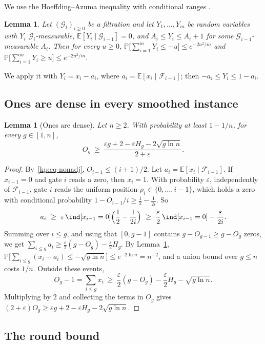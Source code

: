 \documentclass[11pt]{amsart}
\newtheorem{lemma}[theorem]{Lemma}
\theoremstyle{definition}
\theoremstyle{remark}
\newcommand{\eps}{\varepsilon}
\newcommand{\PP}{\mathbb{P}}
\newcommand{\EE}{\mathbb{E}}
\newcommand{\cF}{\mathcal{F}}
\begin{document}
We use the Hoeffding--Azuma inequality with conditional ranges
\cite{hoeffding,kp-mcdiarmid}.

\begin{lemma}\label{kp:azuma}
Let $(\mathcal G_i)_{i\ge 0}$ be a filtration and let $Y_1,\dots,Y_m$ be random
variables with $Y_i$ $\mathcal G_i$-measurable, $\EE[Y_i\mid\mathcal G_{i-1}]=0$,
and $A_i\le Y_i\le A_i+1$ for some $\mathcal G_{i-1}$-measurable $A_i$. Then for
every $u\ge 0$,
$\PP\bigl[\sum_{i=1}^m Y_i\le -u\bigr]\le e^{-2u^2/m}$ and
$\PP\bigl[\sum_{i=1}^m Y_i\ge u\bigr]\le e^{-2u^2/m}$.
\end{lemma}

We apply it with $Y_i=x_i-a_i$, where $a_i=\EE[x_i\mid\cF_{i-1}]$; then
$-a_i\le Y_i\le 1-a_i$.

\subsection{Ones are dense in every smoothed instance}\label{kp:sub-dense}

\begin{lemma}[Ones are dense]\label{kp:dense}
Let $n\ge 2$. With probability at least $1-1/n$, for every $g\in[1,n]$,
\[
  O_g\ \ge\ \frac{\eps g+2-\eps H_g-2\sqrt{g\ln n}}{2+\eps}.
\]
\end{lemma}

\begin{proof}
By~\eqref{kp:eq-nonadj}, $O_{i-1}\le(i+1)/2$. Let $a_i=\EE[x_i\mid\cF_{i-1}]$.
If $x_{i-1}=0$ and gate $i$ reads a zero, then $x_i=1$. With probability $\eps$,
independently of $\cF_{i-1}$, gate $i$ reads the uniform position
$\rho_i\in\{0,\dots,i-1\}$, which holds a zero with conditional probability
$1-O_{i-1}/i\ge\frac12-\frac1{2i}$. So
\[
  a_i\ \ge\ \eps\,\ind[x_{i-1}=0]\Bigl(\frac12-\frac1{2i}\Bigr)
  \ \ge\ \frac\eps2\,\ind[x_{i-1}=0]-\frac{\eps}{2i}.
\]
Summing over $i\le g$, and using that $[0,g-1]$ contains
$g-O_{g-1}\ge g-O_g$ zeros, we get
$\sum_{i\le g}a_i\ge\frac\eps2(g-O_g)-\frac\eps2H_g$. By
Lemma~\ref{kp:azuma},
$\PP\bigl[\sum_{i\le g}(x_i-a_i)\le-\sqrt{g\ln n}\bigr]\le e^{-2\ln n}=n^{-2}$,
and a union bound over $g\le n$ costs $1/n$. Outside these events,
\[
  O_g-1=\sum_{i\le g}x_i\ \ge\ \frac\eps2(g-O_g)-\frac\eps2H_g-\sqrt{g\ln n}.
\]
Multiplying by $2$ and collecting the terms in $O_g$ gives
$(2+\eps)O_g\ge\eps g+2-\eps H_g-2\sqrt{g\ln n}$.
\end{proof}

\subsection{The round bound}\label{kp:sub-round}
\end{document}
